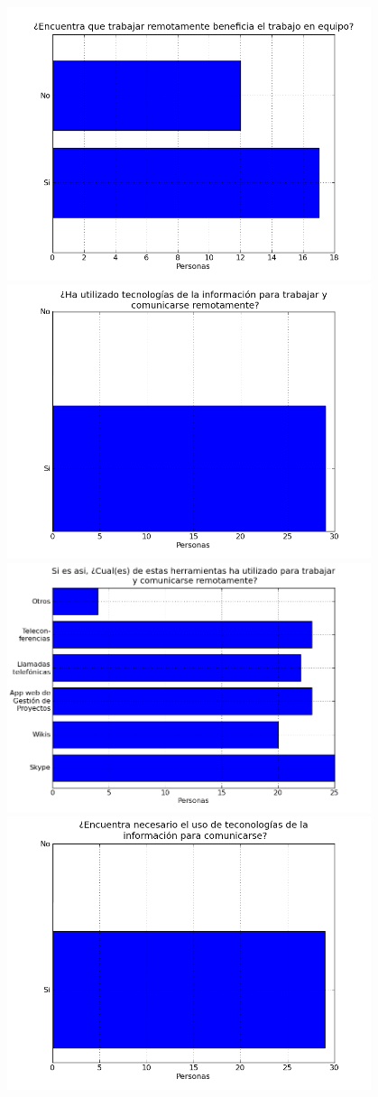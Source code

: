 \begin{center}
	\includegraphics[width=0.8\textwidth]{images/fig4}\\
	\includegraphics[width=0.8\textwidth]{images/fig5}\\
	\includegraphics[width=0.8\textwidth]{images/fig6}\\
	\includegraphics[width=0.8\textwidth]{images/fig7}\\

\end{center}

